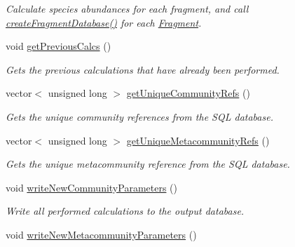 \begin{DoxyCompactItemize}
\begin{DoxyCompactList}\small\item\em Calculate species abundances for each fragment, and call \hyperlink{class_community_ad6515ff43ea8189a1acdcccfe893bbba}{create\+Fragment\+Database()} for each \hyperlink{struct_fragment}{Fragment}. \end{DoxyCompactList}\item 
void \hyperlink{class_community_a24c425f32b1e3b10227e2d04cbacfe31}{get\+Previous\+Calcs} ()\hypertarget{class_community_a24c425f32b1e3b10227e2d04cbacfe31}{}\label{class_community_a24c425f32b1e3b10227e2d04cbacfe31}

\begin{DoxyCompactList}\small\item\em Gets the previous calculations that have already been performed. \end{DoxyCompactList}\item 
vector$<$ unsigned long $>$ \hyperlink{class_community_aed61108d8c4fd42d39a9112c5062cad4}{get\+Unique\+Community\+Refs} ()
\begin{DoxyCompactList}\small\item\em Gets the unique community references from the S\+QL database. \end{DoxyCompactList}\item 
vector$<$ unsigned long $>$ \hyperlink{class_community_a257e8e3dce33b235985ed9d167817a89}{get\+Unique\+Metacommunity\+Refs} ()
\begin{DoxyCompactList}\small\item\em Gets the unique metacommunity reference from the S\+QL database. \end{DoxyCompactList}\item 
void \hyperlink{class_community_afbc8709084a00a7450e3a168cb016db9}{write\+New\+Community\+Parameters} ()\hypertarget{class_community_afbc8709084a00a7450e3a168cb016db9}{}\label{class_community_afbc8709084a00a7450e3a168cb016db9}

\begin{DoxyCompactList}\small\item\em Write all performed calculations to the output database. \end{DoxyCompactList}\item 
void \hyperlink{class_community_a24295f76ee61b598da18f59dec247d45}{write\+New\+Metacommunity\+Parameters} ()\hypertarget{class_community_a24295f76ee61b598da18f59dec247d45}{}\label{class_community_a24295f76ee61b598da18f59dec247d45}


\end{DoxyCompactItemize}
